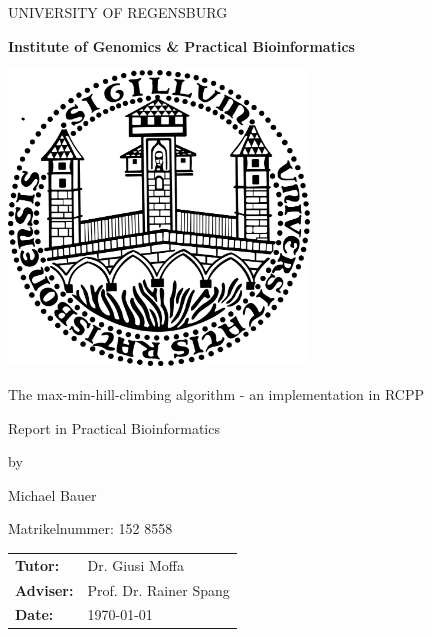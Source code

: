  


\usepackage{geometry}
\geometry{tmargin=2cm,bmargin=3cm,lmargin=2cm,rmargin=2cm}

\usepackage{tikz}
\usetikzlibrary{arrows}



\pagestyle{empty}


\clearscrheadings\clearscrplain

\begin{center}

\begin{huge}
UNIVERSITY OF REGENSBURG\\
\end{huge}
{\Large \textbf{Institute of Genomics \& Practical Bioinformatics}}
\vspace{10mm}

\includegraphics[width=8cm]{img/uniR.png}


\vspace{10mm}
\begin{huge}
The max-min-hill-climbing algorithm - an implementation in RCPP
\end{huge}

\vspace{10mm}

\begin{Large}
Report in Practical Bioinformatics
\end{Large}

\vspace{5mm}
\begin{small}
by
\end{small}

\begin{large}
Michael Bauer
\end{large}

\begin{small}
Matrikelnummer: 152 8558
\end{small}

\vspace{1cm}
\begin{tabular}{ll}
{\bf Tutor:} &Dr. Giusi Moffa\\
{\bf Adviser:} &Prof. Dr. Rainer Spang\\
{\bf Date:} &\today\\
\end{tabular}

\end{center}
\clearpage

